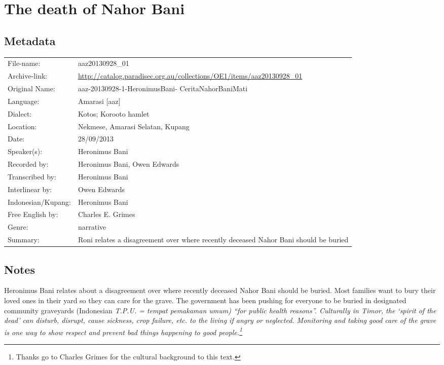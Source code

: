 \section{The death of Nahor Bani}\label{sec:DeaNahBan}
\subsection{Metadata}

\wg\begin{tabular}{lL{.67\textwidth}}
File-name:					& aaz20130928{\_}01\\
Archive-link:				& \url{http://catalog.paradisec.org.au/collections/OE1/items/aaz20130928_01}\\
Original Name:			& aaz-20130928-1-HeronimusBani- CeritaNahorBaniMati\\
Language:						& Amarasi [aaz] \\
Dialect:						& Kotos; Koro{\Q}oto hamlet \\
Location:						& Nekmese{\Q}, Amarasi Selatan, Kupang \\
Date:								&	28/09/2013\\
Speaker(s):					& Heronimus Bani\\
Recorded by: 				& Heronimus Bani, Owen Edwards\\
Transcribed by:			& Heronimus Bani\\
Interlinear by:			& Owen Edwards \\
Indonesian/Kupang:	& Heronimus Bani\\
Free English by:		& Charles E. Grimes\\
Genre:							& narrative\\
Summary:						& Roni relates a disagreement over where recently
										deceased Nahor Bani should be buried\\
\end{tabular}


\subsection{Notes}
Heronimus Bani relates about a disagreement over where recently deceased
Nahor Bani should be buried.
Most families want to bury their loved
ones in their yard so they can care for the grave.
The government has been pushing for everyone
to be buried in designated community graveyards
(Indonesian \it{T.P.U.} = \it{tempat pemakaman umum})
``for public health reasons''.
Culturally in Timor, the  `spirit of the dead' can disturb,
disrupt, cause sickness, crop failure, etc. to the living if angry or neglected.
Monitoring and taking good care of the grave
is one way to show respect and prevent bad
things happening to good people.\footnote{
		Thanks go to Charles Grimes for the cultural background to this text.}

